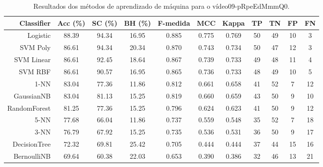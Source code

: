 \begin{table}[!htb]
\centering
\caption{Resultados dos métodos de aprendizado de máquina para o vídeo09-pRpeEdMmmQ0.}
\label{tab:09-pRpeEdMmmQ0}
\begin{tabular}{r|c|c|c|c|c|c|c|c|c|c}
\hline\hline
Classifier & Acc (\%) & SC (\%) & BH (\%) & F-medida & MCC & Kappa & TP & TN & FP & FN \\ \hline
Logistic & 88.39 & 94.34 & 16.95 & 0.885 & 0.775 & 0.769 & 50 & 49 & 10 & 3 \\ 
SVM Poly & 86.61 & 94.34 & 20.34 & 0.870 & 0.743 & 0.734 & 50 & 47 & 12 & 3 \\ 
SVM Linear & 86.61 & 92.45 & 18.64 & 0.867 & 0.739 & 0.733 & 49 & 48 & 11 & 4 \\ 
SVM RBF & 86.61 & 90.57 & 16.95 & 0.865 & 0.736 & 0.733 & 48 & 49 & 10 & 5 \\ 
1-NN & 83.04 & 77.36 & 11.86 & 0.812 & 0.661 & 0.658 & 41 & 52 & 7 & 12 \\ 
GaussianNB & 83.04 & 81.13 & 15.25 & 0.819 & 0.660 & 0.659 & 43 & 50 & 9 & 10 \\ 
RandomForest & 81.25 & 77.36 & 15.25 & 0.796 & 0.624 & 0.623 & 41 & 50 & 9 & 12 \\ 
5-NN & 77.68 & 66.04 & 11.86 & 0.737 & 0.559 & 0.548 & 35 & 52 & 7 & 18 \\ 
3-NN & 76.79 & 67.92 & 15.25 & 0.735 & 0.536 & 0.531 & 36 & 50 & 9 & 17 \\ 
DecisionTree & 72.32 & 69.81 & 25.42 & 0.705 & 0.444 & 0.444 & 37 & 44 & 15 & 16 \\ 
BernoulliNB & 69.64 & 60.38 & 22.03 & 0.653 & 0.390 & 0.386 & 32 & 46 & 13 & 21 \\ 
\hline\hline
\end{tabular}
\end{table}
